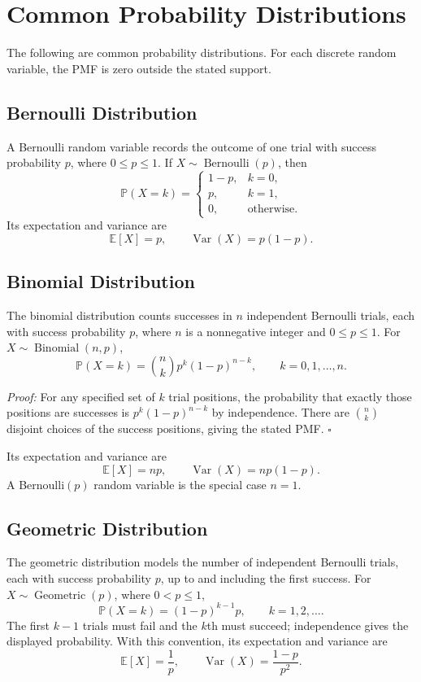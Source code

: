 \documentclass[a4paper,11pt,abstracton]{scrartcl}
\theoremstyle{dotlessP}
\theoremstyle{dotlessS}
\theoremstyle{remark}
\theoremstyle{definition}
\begin{document}
\section{Common Probability Distributions}

The following are common probability distributions. For each discrete random variable, the PMF is zero outside the stated support.

\subsection{Bernoulli Distribution}

A Bernoulli random variable records the outcome of one trial with success probability $p$, where $0\leq p\leq1$. If $X\sim\operatorname{Bernoulli}(p)$, then
\[
  \mathbb{P}(X=k)=
  \begin{cases}
    1-p,&k=0,\\
    p,&k=1,\\
    0,&\text{otherwise}.
  \end{cases}
\]
Its expectation and variance are
\[
  \mathbb{E}[X]=p,\qquad \operatorname{Var}(X)=p(1-p).
\]

\subsection{Binomial Distribution}

The binomial distribution counts successes in $n$ independent Bernoulli trials, each with success probability $p$, where $n$ is a nonnegative integer and $0\leq p\leq1$. For $X\sim\operatorname{Binomial}(n,p)$,
\[
  \mathbb{P}(X=k)=\binom{n}{k}p^k(1-p)^{n-k},
  \qquad k=0,1,\ldots,n.
\]
\begin{claim_box}
\textit{Proof:} For any specified set of $k$ trial positions, the probability that exactly those positions are successes is $p^k(1-p)^{n-k}$ by independence. There are $\binom{n}{k}$ disjoint choices of the success positions, giving the stated PMF.
\hfill$\square$
\end{claim_box}
Its expectation and variance are
\[
  \mathbb{E}[X]=np,\qquad \operatorname{Var}(X)=np(1-p).
\]
A Bernoulli$(p)$ random variable is the special case $n=1$.

\subsection{Geometric Distribution}

The geometric distribution models the number of independent Bernoulli trials, each with success probability $p$, up to and including the first success. For $X\sim\operatorname{Geometric}(p)$, where $0<p\leq1$,
\[
  \mathbb{P}(X=k)=(1-p)^{k-1}p,
  \qquad k=1,2,\ldots.
\]
The first $k-1$ trials must fail and the $k$th must succeed; independence gives the displayed probability.
With this convention, its expectation and variance are
\[
  \mathbb{E}[X]=\frac{1}{p},\qquad
  \operatorname{Var}(X)=\frac{1-p}{p^2}.
\]
\end{document}
